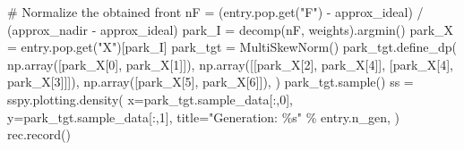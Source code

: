 \documentclass[
  letterpaper,
  DIV=11,
  numbers=noendperiod]{scrartcl}
\newenvironment{Shaded}{\begin{snugshade}}{\end{snugshade}}
\newcommand{\CommentTok}[1]{\textcolor[rgb]{0.37,0.37,0.37}{#1}}
\newcommand{\DecValTok}[1]{\textcolor[rgb]{0.68,0.00,0.00}{#1}}
\newcommand{\NormalTok}[1]{\textcolor[rgb]{0.00,0.23,0.31}{#1}}
\newcommand{\OperatorTok}[1]{\textcolor[rgb]{0.37,0.37,0.37}{#1}}
\newcommand{\SpecialCharTok}[1]{\textcolor[rgb]{0.37,0.37,0.37}{#1}}
\newcommand{\StringTok}[1]{\textcolor[rgb]{0.13,0.47,0.30}{#1}}
\begin{document}
\begin{Shaded}
\begin{Highlighting}[]
        \CommentTok{\# Normalize the obtained front}
\NormalTok{        nF }\OperatorTok{=}\NormalTok{ (entry.pop.get(}\StringTok{"F"}\NormalTok{) }\OperatorTok{{-}}\NormalTok{ approx\_ideal) }\OperatorTok{/}\NormalTok{ (approx\_nadir }\OperatorTok{{-}}\NormalTok{ approx\_ideal)}
\NormalTok{        park\_I }\OperatorTok{=}\NormalTok{ decomp(nF, weights).argmin()}
\NormalTok{        park\_X }\OperatorTok{=}\NormalTok{ entry.pop.get(}\StringTok{"X"}\NormalTok{)[park\_I]}
\NormalTok{        park\_tgt }\OperatorTok{=}\NormalTok{ MultiSkewNorm()}
\NormalTok{        park\_tgt.define\_dp(}
\NormalTok{            np.array([park\_X[}\DecValTok{0}\NormalTok{], park\_X[}\DecValTok{1}\NormalTok{]]),}
\NormalTok{            np.array([[park\_X[}\DecValTok{2}\NormalTok{], park\_X[}\DecValTok{4}\NormalTok{]], [park\_X[}\DecValTok{4}\NormalTok{], park\_X[}\DecValTok{3}\NormalTok{]]]),}
\NormalTok{            np.array([park\_X[}\DecValTok{5}\NormalTok{], park\_X[}\DecValTok{6}\NormalTok{]]),}
\NormalTok{        )}
\NormalTok{        park\_tgt.sample()}
\NormalTok{        ss }\OperatorTok{=}\NormalTok{ sspy.plotting.density(}
\NormalTok{            x}\OperatorTok{=}\NormalTok{park\_tgt.sample\_data[:,}\DecValTok{0}\NormalTok{],}
\NormalTok{            y}\OperatorTok{=}\NormalTok{park\_tgt.sample\_data[:,}\DecValTok{1}\NormalTok{],}
\NormalTok{            title}\OperatorTok{=}\StringTok{"Generation: }\SpecialCharTok{\%s}\StringTok{"} \OperatorTok{\%}\NormalTok{ entry.n\_gen,}
\NormalTok{        )}
\NormalTok{        rec.record()}
\end{Highlighting}
\end{Shaded}
\end{document}
